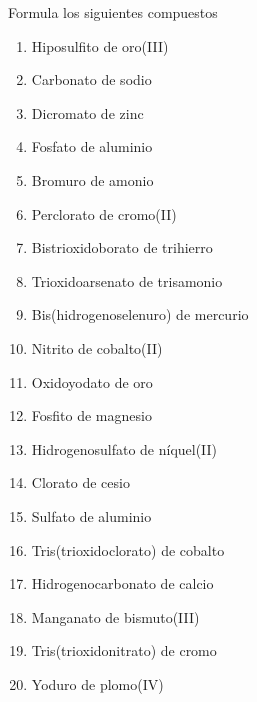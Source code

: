 \begin{exercise}[
    tags    = {inorgánica,sales, sales ternarias, oxosales,2B},
    topics  = {química inorgánica,formulación,nomenclatura},
    source  = {Química 2B OXF 2016, p347, e12},
  ]
  Formula los siguientes compuestos

  \begin{enumerate}
    \item Hiposulfito de oro(III)
    \item Carbonato de sodio
    \item Dicromato de zinc
    \item Fosfato de aluminio
    \item Bromuro de amonio
    \item Perclorato de cromo(II)
    \item Bistrioxidoborato de trihierro
    \item Trioxidoarsenato de trisamonio
    \item Bis(hidrogenoselenuro) de mercurio
    \item Nitrito de cobalto(II)
    \item Oxidoyodato de oro
    \item Fosfito de magnesio
    \item Hidrogenosulfato de níquel(II)
    \item Clorato de cesio
    \item Sulfato de aluminio
    \item Tris(trioxidoclorato) de cobalto
    \item Hidrogenocarbonato de calcio
    \item Manganato de bismuto(III)
    \item Tris(trioxidonitrato) de cromo
    \item Yoduro de plomo(IV)
  \end{enumerate}
\end{exercise}
